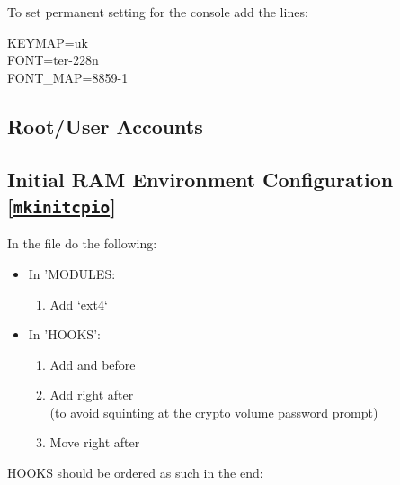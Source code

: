 \begin{blocksection}
	To set permanent setting for the console add the lines:\\
	\begin{codeblock}
		KEYMAP=uk\\
		FONT=ter-228n\\
		FONT\_MAP=8859-1
	\end{codeblock}
\end{blocksection}

\subsection{Root/User Accounts}


\subsection{Initial RAM Environment Configuration [\href{https://wiki.archlinux.org/index.php/mkinitcpio}{\texttt{mkinitcpio}}]}

\begin{blocksection}
	In the file do the following:
	\begin{itemize}[noitemsep,topsep=0pt,leftmargin=*]
		\item In 'MODULES:
		\begin{enumerate}
			\item Add `ext4`
		\end{enumerate}
		\item In 'HOOKS':
		\begin{enumerate}
			\item Add  and  before 
			\item Add  right after \\
			(to avoid squinting at the crypto volume password prompt)
			\item Move  right after 
		\end{enumerate}
	\end{itemize}
	HOOKS should be ordered as such in the end:\\
\end{blocksection}

